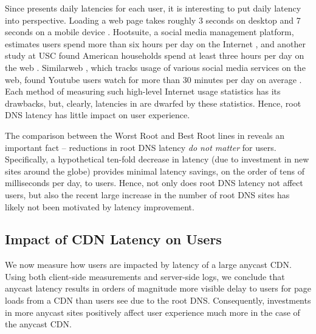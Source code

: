 \documentclass[sigconf,letterpaper,nonacm,10pt,anonymous]{acmart}
\begin{document}
Since  presents daily latencies for
each user, it is interesting to put daily latency into perspective.
Loading a web page takes roughly 3 seconds on desktop and 7 seconds on a
mobile device \cite{http_archive}. Hootsuite, a social media management
platform, estimates users spend more than six hours per day on the
Internet \cite{hootsuite_daily_internet}, and another study at USC found
American households spend at least three hours per day on the web
\cite{digital_future}. Similarweb \cite{similarweb}, which tracks usage
of various social media services on the web, found Youtube users watch
for more than 30 minutes per day on average \cite{similarweb}. Each
method of measuring such high-level Internet usage statistics has its
drawbacks, but, clearly, latencies in
 are dwarfed by these statistics.
Hence, root DNS latency has little impact on user experience.

The comparison between the Worst Root and Best Root lines in
 reveals an important fact --
reductions in root DNS latency \emph{do not matter} for users.
Specifically, a hypothetical ten-fold decrease in latency (\ie due to
investment in new sites around the globe) provides minimal latency
savings, on the order of tens of milliseconds per day, to users. Hence,
not only does root DNS latency not affect users, but also the recent
large increase in the number of root DNS sites has likely not been
motivated by latency improvement.

\subsection{Impact of CDN Latency on
Users}\label{impact-of-cdn-latency-on-users}

\label{sec:anycast_cdn_latency}

We now measure how users are impacted by latency of a large anycast CDN.
Using both client-side measurements and server-side logs, we conclude
that anycast latency results in orders of magnitude more visible delay
to users for page loads from a CDN than users see due to the root DNS.
Consequently, investments in more anycast sites positively affect user
experience much more in the case of the anycast CDN.
\end{document}
